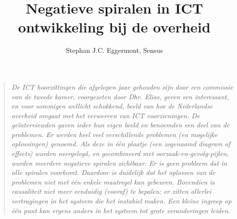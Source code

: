 \documentclass[10pt]{article}   	%
\title{Negatieve spiralen in ICT ontwikkeling bij de overheid}
\author{Stephan J.C. Eggermont, Sensus}
\begin{document}
\newcommand{\logo}{\fontsize{31}{31}\selectfont}
\newcommand{\logosmall}{\fontsize{7.2}{7.2}\selectfont}

\setlength{\parindent}{0pt}
\maketitle
\begin{quote}
\em
De ICT hoorzittingen die afgelopen jaar gehouden zijn door een commissie van de tweede kamer, voorgezeten door
Dhr. Elias, geven een interessant, en voor sommigen wellicht schokkend, beeld van hoe de Nederlandse 
overheid omgaat met het verwerven van ICT voorzieningen. De geïnterviewden gaven ieder hun eigen
beeld en benoemden een deel van de problemen. Er werden heel veel verschillende problemen (en 
mogelijke oplossingen) genoemd. Als deze in één plaatje (een zogenaamd diagram 
of effects\cite{Weinberg1991}) worden neergelegd, en gecombineerd met
oorzaak-en-gevolg-pijlen, worden meerdere negatieve spiralen zichtbaar. Er is geen probleem dat in alle
spiralen voorkomt. Daardoor is duidelijk dat het oplossen van de problemen niet met één enkele maatregel 
kan gebeuren. Bovendien is causaliteit niet meer eenduidig (vooraf) te bepalen:
er zitten allerlei vertragingen in het systeem die het instabiel
maken. Een kleine ingreep op één punt kan ergens anders in het systeem
tot grote veranderingen leiden.\cite{SnowdenBoone2007} 
\end{quote} 
\end{document}
